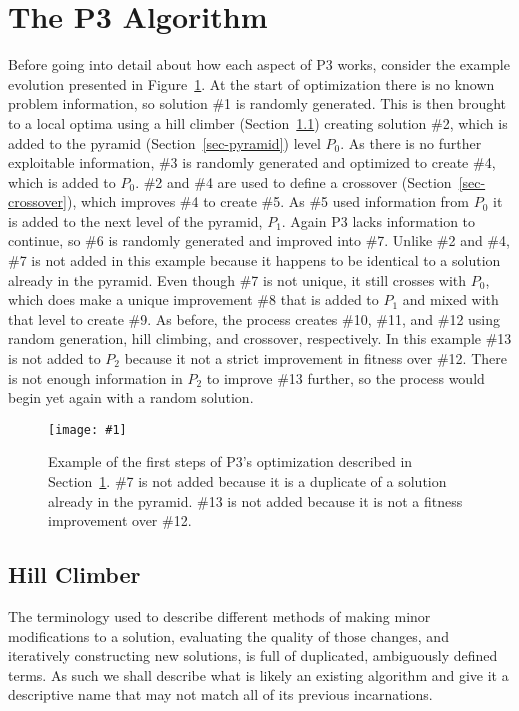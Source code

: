 \documentclass{sig-alternate}
\newcommand{\includegraphicsfit}[1]
{\texttt{[image: \#1]}}
\begin{document}
\section{The P3 Algorithm}
\label{sec-p3}
Before going into detail about how each aspect of P3 works, consider the example
evolution presented in Figure~\ref{fig-p3}.  At the start of optimization there
is no known problem information, so solution \#1 is randomly generated.  This
is then brought to a local optima using a hill climber (Section~\ref{sec-hillclimber})
creating solution \#2, which is added to the pyramid (Section~\ref{sec-pyramid}) level
$P_0$.  As there is no further exploitable information, \#3 is randomly generated
and optimized to create \#4, which is added to $P_0$.  \#2 and \#4 are used to
define a crossover (Section~\ref{sec-crossover}), which improves \#4 to create
\#5. As \#5 used information from $P_0$ it is added to the next level of the pyramid, $P_1$.
Again P3 lacks information to continue, so \#6 is randomly generated and improved into
\#7.  Unlike \#2 and \#4, \#7 is not added in this example because it happens to be identical to
a solution already in the pyramid.  Even though \#7 is not unique, it still crosses with
$P_0$, which does make a unique improvement \#8 that is added to $P_1$ and mixed with that
level to create \#9.  As before, the process creates \#10, \#11, and \#12 using
random generation, hill climbing, and crossover, respectively.  In this example \#13
is not added to $P_2$ because it not a strict improvement in fitness over \#12.  There
is not enough information in $P_2$ to improve \#13 further, so the process would begin
yet again with a random solution.

\begin{figure}
  \centering
  \includegraphicsfit{P3_big_fail}
  \caption{Example of the first steps of P3's optimization described in Section~\ref{sec-p3}.
  \#7 is not added because it is a duplicate of a solution already in the pyramid.  \#13 is
  not added because it is not a fitness improvement over \#12.}
  \label{fig-p3}
\end{figure}

\subsection{Hill Climber}
\label{sec-hillclimber}
The terminology used to describe different methods of making minor modifications
to a solution, evaluating the quality of those changes, and iteratively constructing
new solutions, is full of duplicated, ambiguously defined terms.  As such we shall
describe what is likely an existing algorithm and give it a descriptive name that
may not match all of its previous incarnations.
\end{document}

